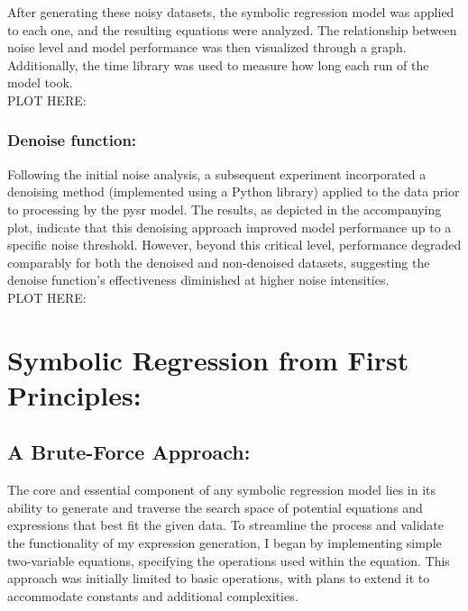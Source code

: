 \documentclass{article}
\begin{document}
After generating these noisy datasets, the symbolic regression model was applied to each one, and the resulting equations were analyzed. The relationship between noise level and model performance was then visualized through a graph. Additionally, the time library was used to measure how long each run of the model took.\\

PLOT HERE:\\

\subsubsection{Denoise function: }

    Following the initial noise analysis, a subsequent experiment incorporated a denoising method (implemented using a Python library) applied to the data prior to processing by the pysr model. The results, as depicted in the accompanying plot, indicate that this denoising approach improved model performance up to a specific noise threshold. However, beyond this critical level, performance degraded comparably for both the denoised and non-denoised datasets, suggesting the denoise function's effectiveness diminished at higher noise intensities.\\

PLOT HERE:\\

\section{Symbolic Regression from First Principles: }


\subsection{A Brute-Force Approach: }

The core and essential component of any symbolic regression model lies in its ability to generate and traverse the search space of potential equations and expressions that best fit the given data. To streamline the process and validate the functionality of my expression generation, I began by implementing simple two-variable equations, specifying the operations used within the equation. This approach was initially limited to basic operations, with plans to extend it to accommodate constants and additional complexities.\\
\end{document}
